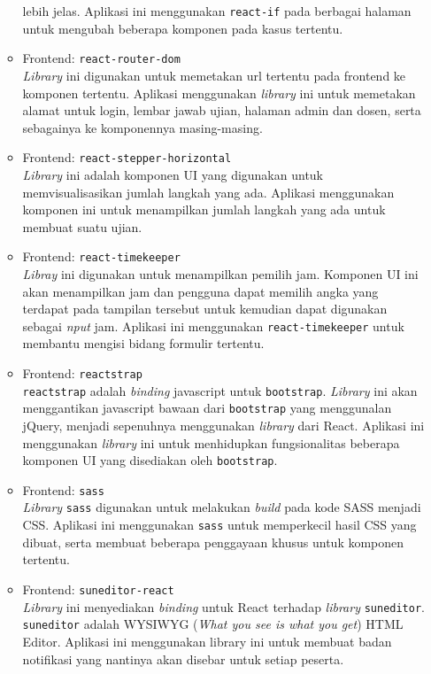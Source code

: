 \begin{itemize}
\begin{itemize}
                    lebih jelas. Aplikasi ini menggunakan \texttt{react-if} pada berbagai halaman untuk mengubah
                    beberapa komponen pada kasus tertentu.
                \item Frontend: \texttt{react-router-dom} \\
                    \textit{Library} ini digunakan untuk memetakan url tertentu pada frontend ke komponen tertentu.
                    Aplikasi menggunakan \textit{library} ini untuk memetakan alamat untuk login, lembar jawab ujian,
                    halaman admin dan dosen, serta sebagainya ke komponennya masing-masing.
                \item Frontend: \texttt{react-stepper-horizontal} \\
                    \textit{Library} ini adalah komponen UI yang digunakan untuk memvisualisasikan
                    jumlah langkah yang ada. Aplikasi menggunakan komponen ini untuk menampilkan jumlah 
                    langkah yang ada untuk membuat suatu ujian.
                \item Frontend: \texttt{react-timekeeper} \\
                    \textit{Libray} ini digunakan untuk menampilkan pemilih jam. Komponen UI ini akan menampilkan
                    jam dan pengguna dapat memilih angka yang terdapat pada tampilan tersebut untuk kemudian
                    dapat digunakan sebagai \textit{nput} jam. Aplikasi ini menggunakan \texttt{react-timekeeper}
                    untuk membantu mengisi bidang formulir tertentu.
                \item Frontend: \texttt{reactstrap} \\
                    \texttt{reactstrap} adalah \textit{binding} javascript untuk \texttt{bootstrap}. \textit{Library}
                    ini akan menggantikan javascript bawaan dari \texttt{bootstrap} yang menggunalan jQuery, menjadi
                    sepenuhnya menggunakan \textit{library} dari React. Aplikasi ini menggunakan \textit{library}
                    ini untuk menhidupkan fungsionalitas beberapa komponen UI yang disediakan oleh \texttt{bootstrap}.
                \item Frontend: \texttt{sass} \\
                    \textit{Library} \texttt{sass} digunakan untuk melakukan \textit{build} pada kode SASS menjadi CSS.
                    Aplikasi ini menggunakan \texttt{sass} untuk memperkecil hasil CSS yang dibuat, serta membuat
                    beberapa penggayaan khusus untuk komponen tertentu.
                \item Frontend: \texttt{suneditor-react} \\
                    \textit{Library} ini menyediakan \textit{binding} untuk React terhadap \textit{library}
                    \texttt{suneditor}. \texttt{suneditor} adalah WYSIWYG (\textit{What you see is what you get})
                    HTML Editor. Aplikasi ini menggunakan library ini untuk membuat badan notifikasi yang nantinya
                    akan disebar untuk setiap peserta.
            \end{itemize}
    \end{itemize}


